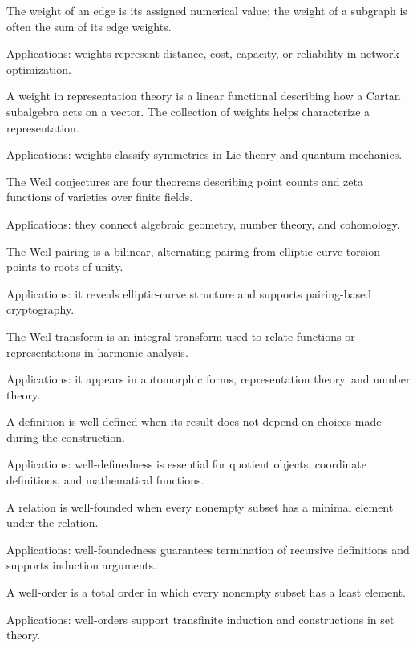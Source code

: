 The weight of an edge is its assigned numerical value; the weight of a subgraph is often the sum of its edge weights. \par\noindent Applications: weights represent distance, cost, capacity, or reliability in network optimization.

A weight in representation theory is a linear functional describing how a Cartan subalgebra acts on a vector. The collection of weights helps characterize a representation. \par\noindent Applications: weights classify symmetries in Lie theory and quantum mechanics.

The Weil conjectures are four theorems describing point counts and zeta functions of varieties over finite fields. \par\noindent Applications: they connect algebraic geometry, number theory, and cohomology.

The Weil pairing is a bilinear, alternating pairing from elliptic-curve torsion points to roots of unity. \par\noindent Applications: it reveals elliptic-curve structure and supports pairing-based cryptography.

The Weil transform is an integral transform used to relate functions or representations in harmonic analysis. \par\noindent Applications: it appears in automorphic forms, representation theory, and number theory.

A definition is well-defined when its result does not depend on choices made during the construction. \par\noindent Applications: well-definedness is essential for quotient objects, coordinate definitions, and mathematical functions.

A relation is well-founded when every nonempty subset has a minimal element under the relation. \par\noindent Applications: well-foundedness guarantees termination of recursive definitions and supports induction arguments.

A well-order is a total order in which every nonempty subset has a least element. \par\noindent Applications: well-orders support transfinite induction and constructions in set theory.

